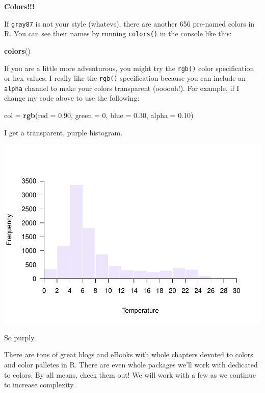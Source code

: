\documentclass[
]{book}
\newenvironment{Shaded}{\begin{snugshade}}{\end{snugshade}}
\newcommand{\DataTypeTok}[1]{\textcolor[rgb]{0.13,0.29,0.53}{#1}}
\newcommand{\DecValTok}[1]{\textcolor[rgb]{0.00,0.00,0.81}{#1}}
\newcommand{\FloatTok}[1]{\textcolor[rgb]{0.00,0.00,0.81}{#1}}
\newcommand{\KeywordTok}[1]{\textcolor[rgb]{0.13,0.29,0.53}{\textbf{#1}}}
\newcommand{\NormalTok}[1]{#1}
\newcommand{\StringTok}[1]{\textcolor[rgb]{0.31,0.60,0.02}{#1}}
\begin{document}
\textbf{Colors!!!}

If \texttt{gray87} is not your style (whatevs), there are another 656 pre-named colors in R. You can see their names by running \texttt{colors()} in the console like this:

\begin{Shaded}
\begin{Highlighting}[]
\KeywordTok{colors}\NormalTok{()}
\end{Highlighting}
\end{Shaded}

If you are a little more adventurous, you might try the \texttt{rgb()} color specification or hex values. I really like the \texttt{rgb()} specification because you can include an \texttt{alpha} channel to make your colors transparent (oooooh!). For example, if I change my code above to use the following:

\begin{Shaded}
\begin{Highlighting}[]
\NormalTok{col =}\StringTok{ }\KeywordTok{rgb}\NormalTok{(}\DataTypeTok{red =} \FloatTok{0.90}\NormalTok{, }\DataTypeTok{green =} \DecValTok{0}\NormalTok{, }\DataTypeTok{blue =} \FloatTok{0.30}\NormalTok{, }\DataTypeTok{alpha =} \FloatTok{0.10}\NormalTok{)}
\end{Highlighting}
\end{Shaded}

I get a transparent, purple histogram.

\includegraphics{worstr_files/figure-latex/unnamed-chunk-90-1.pdf}

So purply.

There are tons of great blogs and eBooks with whole chapters devoted to colors and color palletes in R. There are even whole packages we'll work with dedicated to colors. By all means, check them out! We will work with a few as we continue to increase complexity.
\end{document}
